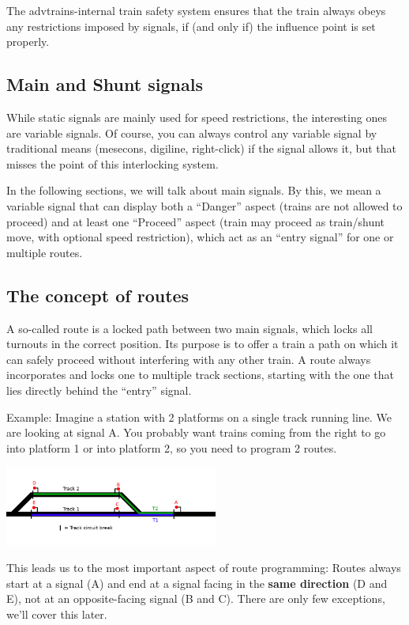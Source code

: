 \documentclass[english]{paper}
\begin{document}
The advtrains-internal train safety system ensures that the train
always obeys any restrictions imposed by signals, if (and only if)
the influence point is set properly.

\subsection{Main and Shunt signals}

While static signals are mainly used for speed restrictions, the interesting
ones are variable signals. Of course, you can always control any variable
signal by traditional means (mesecons, digiline, right-click) if the
signal allows it, but that misses the point of this interlocking system.

In the following sections, we will talk about main signals. By this,
we mean a variable signal that can display both a ``Danger'' aspect
(trains are not allowed to proceed) and at least one ``Proceed''
aspect (train may proceed as train/shunt move, with optional speed
restriction), which act as an ``entry signal'' for one or multiple
routes.

\subsection{The concept of routes}

A so-called route is a locked path between two main signals, which
locks all turnouts in the correct position. Its purpose is to offer
a train a path on which it can safely proceed without interfering
with any other train. A route always incorporates and locks one to
multiple track sections, starting with the one that lies directly
behind the ``entry'' signal.

Example: Imagine a station with 2 platforms on a single track running
line. We are looking at signal A. You probably want trains coming
from the right to go into platform 1 or into platform 2, so you need
to program 2 routes.

\includegraphics[width=7cm]{6_home_moritz_Home_Projekte_Minetest_minetest_mods_advtrains_assets_lyx_img_route_ex1.png}

This leads us to the most important aspect of route programming: Routes
always start at a signal (A) and end at a signal facing in the \textbf{same
direction} (D and E), not at an opposite-facing signal (B and C).
There are only few exceptions, we'll cover this later.
\end{document}
